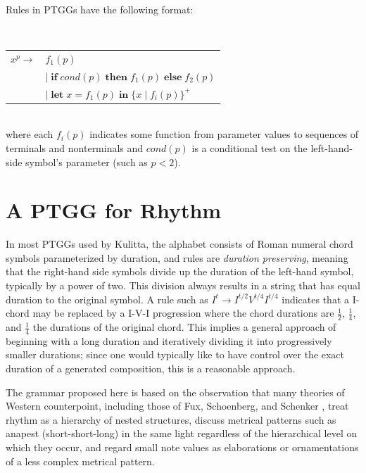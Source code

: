\documentclass{article}
\begin{document}
Rules in PTGGs have the following format:

$\;$ \\
\begin{tabular}{ll}
$x^p \rightarrow$ & $f_{1}(p)$ \\
$\;$ & $ \vert \;  \textbf{if} \; cond(p) \; \textbf{then} \; f_{1}(p) \; \textbf{else} \; f_{2}(p)$ \\
$\;$ & $\vert \; \textbf{let} \; x = f_{1}(p) \; \textbf{in} \; \{x \; | \; f_{i}(p)\}^{+}$ \\
\end{tabular} $\;$ \\

\noindent where each $f_{i}(p)$ indicates some function from parameter values to sequences of terminals and nonterminals and $cond(p)$ is a conditional test on the left-hand-side symbol's parameter (such as $p<2$).


\section{A PTGG for Rhythm}


In most PTGGs used by Kulitta, the alphabet consists of Roman numeral chord symbols parameterized by duration, and rules are \emph{duration preserving}, meaning that the right-hand side symbols divide up the duration of the left-hand symbol, typically by a power of two. This division always results in a string that has equal duration to the original symbol. A rule such as $I^{t} \rightarrow I^{t/2} V^{t/4} I^{t/4}$ indicates that a I-chord may be replaced by a I-V-I progression where the chord durations are $\frac{1}{2}$, $\frac{1}{4}$, and $\frac{1}{4}$ the durations of the original chord. This implies a general approach of beginning with a long duration and iteratively dividing it into progressively smaller durations; since one would typically like to have control over the exact duration of a generated composition, this is a reasonable approach.

The grammar proposed here is based on the observation that many theories of Western counterpoint, including those of Fux, Schoenberg, and Schenker \cite{fux_et_al, schoenberg}, treat rhythm as a hierarchy of nested structures, discuss metrical patterns such as anapest (short-short-long) in the same light regardless of the hierarchical level on which they occur, and regard small note values as elaborations or ornamentations of a less complex metrical pattern.
\end{document}
